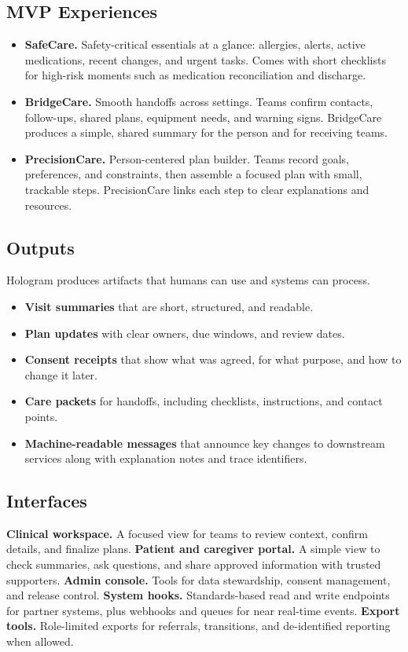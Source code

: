 \documentclass[12pt]{article}
\begin{document}
\subsection*{MVP Experiences}
\begin{itemize}[leftmargin=*]
  \item \textbf{SafeCare.} Safety-critical essentials at a glance: allergies, alerts, active medications, recent changes, and urgent tasks. Comes with short checklists for high-risk moments such as medication reconciliation and discharge.
  \item \textbf{BridgeCare.} Smooth handoffs across settings. Teams confirm contacts, follow-ups, shared plans, equipment needs, and warning signs. BridgeCare produces a simple, shared summary for the person and for receiving teams.
  \item \textbf{PrecisionCare.} Person-centered plan builder. Teams record goals, preferences, and constraints, then assemble a focused plan with small, trackable steps. PrecisionCare links each step to clear explanations and resources.
\end{itemize}

\subsection*{Outputs}
Hologram produces artifacts that humans can use and systems can process.
\begin{itemize}[leftmargin=*]
  \item \textbf{Visit summaries} that are short, structured, and readable.
  \item \textbf{Plan updates} with clear owners, due windows, and review dates.
  \item \textbf{Consent receipts} that show what was agreed, for what purpose, and how to change it later.
  \item \textbf{Care packets} for handoffs, including checklists, instructions, and contact points.
  \item \textbf{Machine-readable messages} that announce key changes to downstream services along with explanation notes and trace identifiers.
\end{itemize}

\subsection*{Interfaces}
\textbf{Clinical workspace.} A focused view for teams to review context, confirm details, and finalize plans.  
\textbf{Patient and caregiver portal.} A simple view to check summaries, ask questions, and share approved information with trusted supporters.  
\textbf{Admin console.} Tools for data stewardship, consent management, and release control.  
\textbf{System hooks.} Standards-based read and write endpoints for partner systems, plus webhooks and queues for near real-time events.  
\textbf{Export tools.} Role-limited exports for referrals, transitions, and de-identified reporting when allowed.
\end{document}
